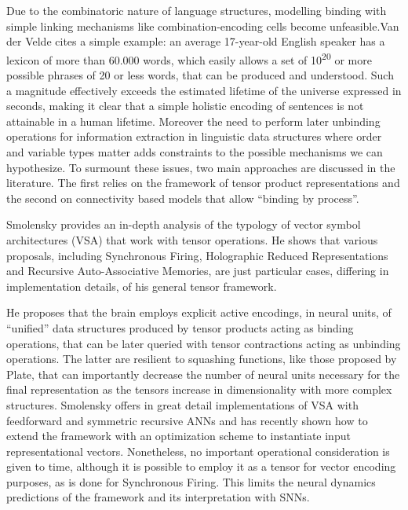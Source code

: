 \documentclass[10pt]{article}
\begin{document}
{\label{946708}}

Due to the combinatoric nature of language structures, modelling binding with simple linking mechanisms like combination-encoding cells 
become unfeasible\cite{von_der_Malsburg_1999}.Van der Velde\cite{van_der_Velde_2006} cites a simple example: an average 17-year-old English speaker has a lexicon of more than 
60.000 words, which easily allows a set of 10\textsuperscript{20} or more possible phrases of 20 or less words, that can be produced and understood.
Such a magnitude effectively exceeds the estimated lifetime of the universe expressed in seconds, 
making it clear that a simple holistic encoding of sentences is not attainable in a human lifetime.
Moreover the need to perform later unbinding operations for information extraction in linguistic data structures where order and variable types matter 
adds constraints to the possible mechanisms we can hypothesize.
To surmount these issues, two main approaches are discussed in the literature.
The first relies on the framework of tensor product representations\cite{smolensky2006harmonic} and 
the second on connectivity based models that allow ``binding by process''\cite{van_der_Velde_2015}.

Smolensky provides an in-depth analysis of the typology of vector symbol architectures (VSA) that work with tensor operations.
He shows that various proposals, including Synchronous Firing\cite{Shastri_1993}, Holographic Reduced Representations\cite{Plate_1995} and Recursive Auto-Associative Memories\cite{Chalmers_1992}, are just particular cases, differing in implementation details, of his general tensor framework.

He proposes that the brain employs explicit active encodings, in neural units, of ``unified'' data structures produced by tensor products acting as binding operations, that can be later queried with tensor contractions acting as unbinding operations.
The latter are resilient to squashing functions, like those proposed by Plate, that can importantly decrease the number of neural units necessary for the final representation as the tensors increase in dimensionality with more complex structures.
Smolensky offers in great detail implementations of VSA with feedforward and symmetric recursive ANNs\cite{smolensky2006harmonic} and has recently shown how to extend the framework with an optimization scheme to instantiate input representational vectors\cite{Smolensky_2013}.
Nonetheless, no important operational consideration is given to time, although it is possible to employ it as a tensor for vector encoding purposes, as is done for Synchronous Firing.
This limits the neural dynamics predictions of the framework and its interpretation with SNNs.
\end{document}
